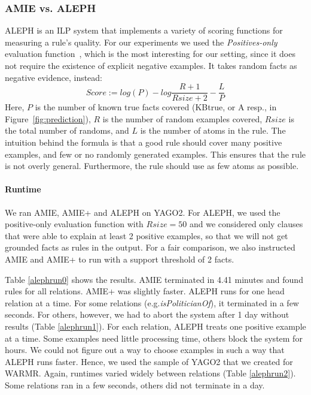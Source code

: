 \subsubsection{AMIE vs. ALEPH}

ALEPH is an ILP system that implements a variety of scoring functions for measuring a rule's quality. For our experiments we used the 
\emph{Positives-only} evaluation function~\cite{Muggleton:1996:LPD:647996.742465,usir1753}, 
which is the most interesting for our setting, since it does not require the existence of explicit negative examples.
It takes random facts as negative evidence, instead:
\[ Score := log(P)-log\frac{R+1}{Rsize+2}-\frac{L}{P} \]
Here, $P$ is the number of known true facts covered (KBtrue, or A resp., in Figure~\ref{fig:prediction}), $R$ is the number of random examples covered, 
$Rsize$ is the total number of randoms, and $L$ is the number of atoms in the rule. 
The intuition behind the formula is that a good rule should cover many positive examples, and few or no randomly generated examples. This ensures
that the rule is not overly general. Furthermore, the rule should use as few atoms as possible.%



\paragraph{Runtime}
We ran AMIE, AMIE+ and ALEPH on YAGO2. For ALEPH, we used the positive-only evaluation function with $Rsize=50$ 
and we considered only clauses that were able to explain at least 2 positive examples,
so that we will not get grounded facts as rules in the output.
For a fair comparison, we also instructed AMIE and AMIE+ to run with a support threshold of 2 facts.

Table \ref{alephrun0} shows the results. AMIE terminated in 4.41 minutes and found rules for all relations. AMIE+ was slightly faster.
ALEPH runs for one head relation at a time. For some relations (e.g.\emph{isPoliticianOf}),
it terminated in a few seconds.
For others, however, we had to abort the system after 1 day without results (Table \ref{alephrun1}).
For each relation, ALEPH treats one positive example at a time. Some examples need little processing time, others block the system for hours.
We could not figure out a way to choose examples in such a way that ALEPH runs faster.
Hence, we used the sample of YAGO2 that we created for WARMR.
Again, runtimes varied widely between relations (Table \ref{alephrun2}).
Some relations ran in a few seconds, others did not terminate in a day.

